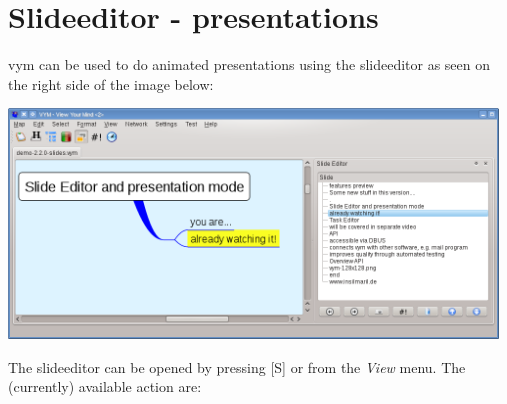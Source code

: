 \documentclass[12pt,a4paper]{article}
\newcommand{\vym}{{\sc vym }}
\newcommand{\key}[1]{[#1]}
\begin{document}
\section{Slideeditor - presentations}\label{slideeditor}
\vym can be used to do animated presentations using the slideeditor as
seen on the right side of the image below:
\begin{center}
    \includegraphics[width=13cm]{images/slideeditor.png}
\end{center}
The slideeditor can be opened by pressing \key{S} or from the {\em View}
menu. The (currently) available action are:
\end{document}
